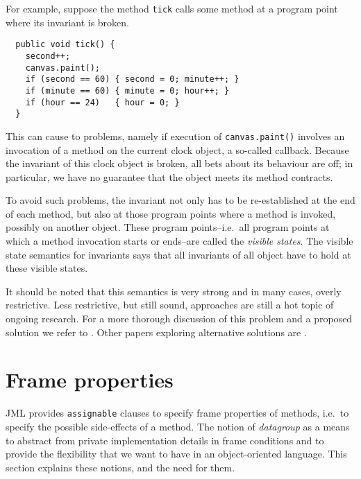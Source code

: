 \documentclass{llncs}
\begin{document}
For example, suppose the method \texttt{tick} calls some method
at a program point where its invariant is broken.
\begin{verbatim}
  public void tick() {
    second++;
    canvas.paint();
    if (second == 60) { second = 0; minute++; }
    if (minute == 60) { minute = 0; hour++; }
    if (hour == 24)   { hour = 0; }
  }
\end{verbatim}
This can cause to problems, namely if execution of \texttt{canvas.paint()} 
involves an invocation of a method on the current clock object, a so-called 
callback. Because the invariant of this clock object is broken, all bets
about its behaviour are off; in particular, we  have no guarantee that the
object meets its method contracts.

To avoid such problems, the invariant not only has to be re-established at the
end of each method, but also at those program points where a method is invoked,
possibly on another object. These program points--i.e.\ all program points
at which a method invocation starts or ends--are called the \emph{visible
states}. The visible state semantics for invariants says that all invariants
of all object have to hold at these visible states.

It should be noted that this semantics is very strong and in many cases,
overly restrictive.  Less restrictive, but still sound, approaches are still a
hot topic of ongoing research. For a more thorough discussion of this problem
and a proposed solution we refer to \cite{Mueller-Poetzsch-Heffter-Leavens05}.
Other papers exploring alternative solutions are
\cite{Huizing-Kuiper00,JacobsLeinoPiessensSchulte05,Middelkoop05}.

\section{Frame properties}
\label{Sec:assignable}


JML provides \texttt{assignable} clauses to specify frame properties
of methods, i.e.\ to specify the possible side-effects of a method.
The notion of \emph{datagroup} as a means to abstract from private implementation 
details in frame conditions and to provide the flexibility that we want
to have in an object-oriented language.
This section explains these notions, and the need for them.
\end{document}
